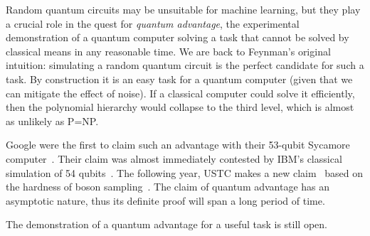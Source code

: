 Random quantum circuits may be unsuitable for machine learning, but they play a crucial role in the quest for \emph{quantum advantage}, the experimental demonstration of a quantum computer solving a task that cannot be solved by classical means in any reasonable time.
We are back to Feynman's original intuition: simulating a random quantum circuit is the perfect candidate for such a task.
By construction it is an easy task for a quantum computer (given that we can mitigate the effect of noise).
If a classical computer could solve it efficiently, then the polynomial hierarchy would collapse to the third level, which is almost as unlikely as P=NP.

Google were the first to claim such an advantage with their 53-qubit Sycamore computer~\cite{AruteEtAl19}.
Their claim was almost immediately contested by IBM's classical simulation of 54 qubits~\cite{PednaultEtAl19}.
The following year, USTC makes a new claim~\cite{ZhongEtAl20a} based on the hardness of boson sampling~\cite{AaronsonArkhipov11}.
The claim of quantum advantage has an asymptotic nature, thus
its definite proof will span a long period of time.

The demonstration of a quantum advantage for a useful task is still open.

%
%
%
%
%
